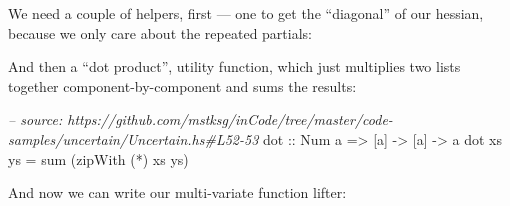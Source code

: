 \documentclass[]{article}
\newenvironment{Shaded}{}{}
\newcommand{\KeywordTok}[1]{\textcolor[rgb]{0.00,0.44,0.13}{\textbf{{#1}}}}
\newcommand{\DataTypeTok}[1]{\textcolor[rgb]{0.56,0.13,0.00}{{#1}}}
\newcommand{\DecValTok}[1]{\textcolor[rgb]{0.25,0.63,0.44}{{#1}}}
\newcommand{\CommentTok}[1]{\textcolor[rgb]{0.38,0.63,0.69}{\textit{{#1}}}}
\newcommand{\OtherTok}[1]{\textcolor[rgb]{0.00,0.44,0.13}{{#1}}}
\newcommand{\FunctionTok}[1]{\textcolor[rgb]{0.02,0.16,0.49}{{#1}}}
\newcommand{\NormalTok}[1]{{#1}}
\begin{document}
We need a couple of helpers, first --- one to get the ``diagonal'' of
our hessian, because we only care about the repeated partials:

\begin{Shaded}
\end{Shaded}

And then a ``dot product'', utility function, which just multiplies two
lists together component-by-component and sums the results:

\begin{Shaded}
\begin{Highlighting}[]
\CommentTok{-- source: https://github.com/mstksg/inCode/tree/master/code-samples/uncertain/Uncertain.hs#L52-53}
\OtherTok{dot ::} \DataTypeTok{Num} \NormalTok{a }\OtherTok{=>} \NormalTok{[a] }\OtherTok{->} \NormalTok{[a] }\OtherTok{->} \NormalTok{a}
\NormalTok{dot xs ys }\FunctionTok{=} \NormalTok{sum (zipWith (}\FunctionTok{*}\NormalTok{) xs ys)}
\end{Highlighting}
\end{Shaded}

And now we can write our multi-variate function lifter:
\end{document}
